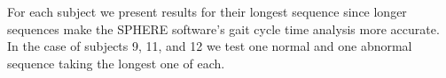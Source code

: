 \documentclass[11pt]{article} %
\begin{document}
For each subject we present results for their longest sequence since longer sequences make the SPHERE software's gait cycle time analysis more accurate. In the case of subjects 9, 11, and 12 we test one normal and one abnormal sequence taking the longest one of each. 

\begin{figure}
\centering

%
\qquad
{}%


\end{figure}
\end{document}
